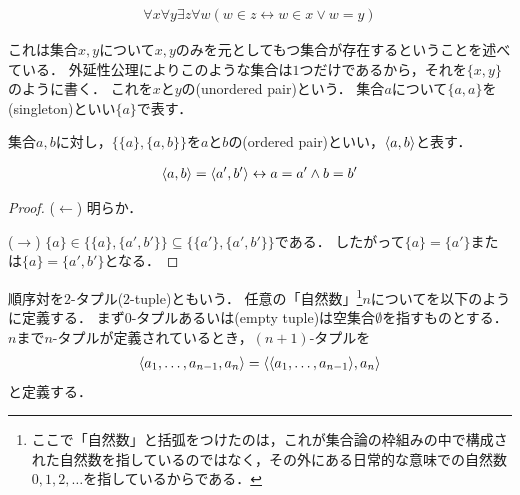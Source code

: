 \documentclass[../main.tex]{subfiles}
\begin{document}
\nocite{saito-kiso}

\begin{thmbox}
\begin{axiom}
\begin{align}
    \forall x \forall y \exists z \forall w (w \in z \leftrightarrow w \in x \lor w = y)
\end{align}
\end{axiom}
\end{thmbox}

これは集合\(x, y\)について\(x, y\)のみを元としてもつ集合が存在するということを述べている．
外延性公理によりこのような集合は\(1\)つだけであるから，それを\(\{x, y\}\)のように書く．
これを\(x\)と\(y\)の(unordered pair)という．
集合\(a\)について\(\{a, a\}\)を(singleton)といい\(\{a\}\)で表す．

\begin{thmbox}
\begin{definition}
集合\(a, b\)に対し，\(\{\{a\}, \{a, b\}\}\)を\(a\)と\(b\)の(ordered pair)といい，\(\langle a, b \rangle\)と表す．
\end{definition}
\end{thmbox}

\begin{proposition}
\begin{align*}
    \langle a, b \rangle = \langle a', b' \rangle \leftrightarrow a = a' \land b = b'
\end{align*}
\end{proposition}

\begin{proof} (\(\leftarrow\)) 明らか．

\noindent (\(\rightarrow\))
\(\{a\} \in \{\{a\}, \{a', b'\}\} \subseteq \{\{a'\}, \{a', b'\}\}\)である．
したがって\(\{a\} = \{a'\}\)または\(\{a\} = \{a', b'\}\)となる．
\end{proof}

順序対を\(2\)-タプル(\(2\)-tuple)ともいう．
任意の「自然数」\footnote{%
ここで「自然数」と括弧をつけたのは，これが集合論の枠組みの中で構成された自然数を指しているのではなく，その外にある日常的な意味での自然数\(0, 1, 2, \ldots\)を指しているからである．
}\(n\)についてを以下のように定義する．
まず\(0\)-タプルあるいは(empty tuple)は空集合\(\emptyset\)を指すものとする．
\(n\)まで\(n\)-タプルが定義されているとき，\((n + 1)\)-タプルを
\begin{align*}
    \langle a_1, \ldots, a_{n - 1}, a_n \rangle = \langle \langle a_1, \ldots, a_{n -1} \rangle, a_n \rangle
\end{align*}
と定義する．
\end{document}
